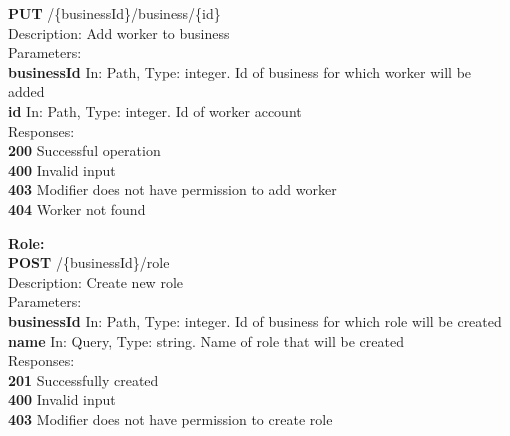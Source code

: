 \documentclass[11pt,a4paper,pdftex]{article}
\begin{document}
\hspace*{1em}\textbf{PUT} /\{businessId\}/business/\{id\}\\
\hspace*{2em}Description: Add worker to business\\
\hspace*{2em}Parameters:\\
\hspace*{3em}\textbf{businessId} In: Path, Type: integer. Id of business for which worker will be added\\
\hspace*{3em}\textbf{id} In: Path, Type: integer. Id of worker account\\
\hspace*{2em}Responses:\\
\hspace*{3em}\textbf{200} Successful operation\\
\hspace*{3em}\textbf{400} Invalid input\\
\hspace*{3em}\textbf{403} Modifier does not have permission to add worker\\
\hspace*{3em}\textbf{404} Worker not found

\textbf{Role:}\\
\hspace*{1em}\textbf{POST} /\{businessId\}/role\\
\hspace*{2em}Description: Create new role\\
\hspace*{2em}Parameters:\\
\hspace*{3em}\textbf{businessId} In: Path, Type: integer. Id of business for which role will be created\\
\hspace*{3em}\textbf{name} In: Query, Type: string. Name of role that will be created\\
\hspace*{2em}Responses:\\
\hspace*{3em}\textbf{201} Successfully created\\
\hspace*{3em}\textbf{400} Invalid input\\
\hspace*{3em}\textbf{403} Modifier does not have permission to create role
\end{document}
